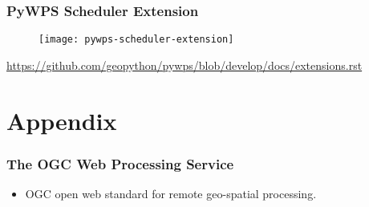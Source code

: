 \documentclass{beamer}
\begin{document}
\begin{frame}
\frametitle<presentation>{PyWPS Scheduler Extension}

  \begin{figure}[ht]
    \centering
    \texttt{[image: pywps-scheduler-extension]}
  \end{figure}

  \centering
  \footnotesize{\url{https://github.com/geopython/pywps/blob/develop/docs/extensions.rst}}

\end{frame}

\appendix

\section{Appendix}

\begin{frame}
\frametitle<presentation>{The OGC Web Processing Service}

  \begin{itemize}
    \item OGC open web standard for remote geo-spatial processing.
  \end{itemize}
\end{frame}
\end{document}
